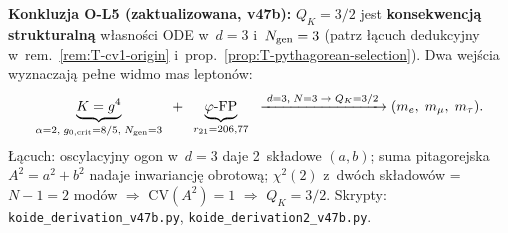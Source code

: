 \begin{remark}[Wyczerpuj\k{a}ce pr\'oby wyprowadzenia $Q_K = 3/2$ (v47b)]
\medskip\noindent
\textbf{Konkluzja O-L5 (zaktualizowana, v47b):}
$Q_K = 3/2$ jest \textbf{konsekwencj\k{a} strukturaln\k{a}}
w\l{}asno\'sci ODE w~$d = 3$ i~$N_{\rm gen} = 3$
(patrz \l{}\k{a}cuch dedukcyjny w~rem.~\ref{rem:T-cv1-origin}
i~prop.~\ref{prop:T-pythagorean-selection}).
Dwa wej\'scia wyznaczaj\k{a} pe\l{}ne widmo mas lepton\'ow:
\[
  \underbrace{K = g^4}_{\alpha = 2,\; g_{0,\rm crit} = 8/5,\; N_{\rm gen} = 3}
  \;\;+\;\;
  \underbrace{\varphi\text{-FP}}_{r_{21} = 206{,}77}
  \;\;\xrightarrow{\;d=3,\;N=3\;\to\;Q_K = 3/2\;}
  (m_e,\; m_\mu,\; m_\tau).
\]
\L{}\k{a}cuch: oscylacyjny ogon w~$d = 3$ daje 2~sk\l{}adowe
$(a,b)$; suma pitagorejska $A^2 = a^2 + b^2$ nadaje inwariancj\k{e}
obrotow\k{a}; $\chi^2(2)$ z~dw\'och sk\l{}adow\'ow
= $N{-}1 = 2$ mod\'ow $\Rightarrow$ $\mathrm{CV}(A^2) = 1$
$\Rightarrow$ $Q_K = 3/2$.
Skrypty: \texttt{koide\_derivation\_v47b.py},
\texttt{koide\_derivation2\_v47b.py}.
\end{remark}

